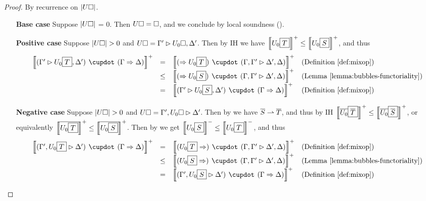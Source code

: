 \begin{proof}
  By recurrence on $\left|U\square\right|$.
  \begin{itemize}
    \item[\textbf{Base case}] Suppose $\left|U\square\right|$ = 0. Then $U\square =
    \square$, and we conclude by local soundness
    ().
    \item[\textbf{Positive case}] Suppose $\left|U\square\right| > 0$ and $U\square =
    \Gamma' \mathbin{\rhd} U_0\square, \Delta'$. Then by IH we have $\left\llbracket U_0\fbox{$T$} \right\rrbracket^+
    \leq \left\llbracket U_0\fbox{$S$} \right\rrbracket^+$, and thus
    $$
    \begin{array}{rcll}
      \psint{(\Gamma' \J U_0\select{T}, \Delta') \mix (\Gamma \seq \Delta)}
      &=& \psint{(\seq U_0\select{T}) \mix (\Gamma, \Gamma' \J \Delta', \Delta)} &\text{(\refdef{mixop})}\\
      &\sement& \psint{(\seq U_0\select{S}) \mix (\Gamma, \Gamma' \J \Delta', \Delta)} &\text{(\reflemma{bubbles-functoriality})}\\
      &=& \psint{(\Gamma' \J U_0\select{S}, \Delta') \mix (\Gamma \seq \Delta)} &\text{(\refdef{mixop})}
    \end{array}
    $$

    \item[\textbf{Negative case}] Suppose $\left|U\square\right| > 0$ and $U\square =
    \Gamma', U_0\square \mathbin{\rhd} \Delta'$. Then by  we have
    $\overline{S} \rightharpoonup \overline{T}$, and thus by IH
    $\left\llbracket \overline{U_0}\fbox{$\overline{T}$} \right\rrbracket^+ \leq
    \left\llbracket \overline{U_0}\fbox{$\overline{S}$} \right\rrbracket^+$, or equivalently
    $\left\llbracket \overline{U_0\fbox{$T$}} \right\rrbracket^+ \leq \left\llbracket \overline{U_0\fbox{$S$}} \right\rrbracket^+$.
    Then by  we get $\left\llbracket U_0\fbox{$S$} \right\rrbracket^- \leq
    \left\llbracket U_0\fbox{$T$} \right\rrbracket^-$, and thus
    $$
    \begin{array}{rcll}
      \psint{(\Gamma', U_0\select{T} \J \Delta') \mix (\Gamma \seq \Delta)}
      &=& \psint{(U_0\select{T} \seq) \mix (\Gamma, \Gamma' \J \Delta', \Delta)} &\text{(\refdef{mixop})}\\
      &\sement& \psint{(U_0\select{S} \seq) \mix (\Gamma, \Gamma' \J \Delta', \Delta)} &\text{(\reflemma{bubbles-functoriality})}\\
      &=& \psint{(\Gamma', U_0\select{S} \J \Delta') \mix (\Gamma \seq \Delta)} &\text{(\refdef{mixop})}
    \end{array}
    $$


\end{itemize}
\end{proof}

